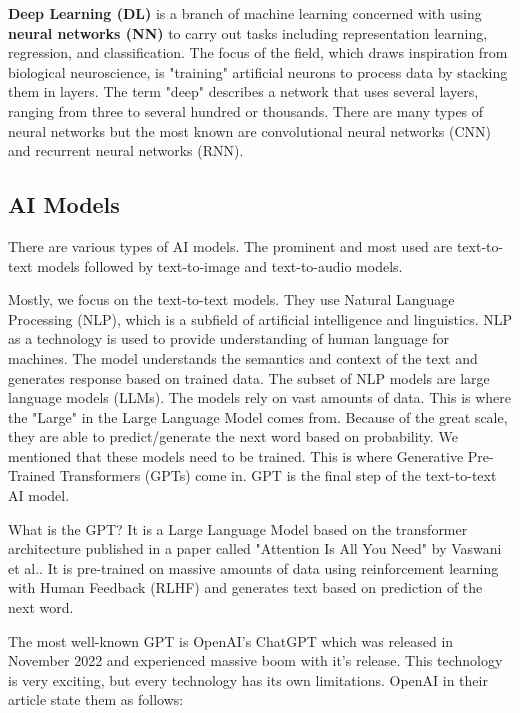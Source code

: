 \textbf{Deep Learning (DL)} is a branch of machine learning concerned with using \textbf{neural networks (NN)} to carry out tasks including representation learning, regression, and classification. The focus of the field, which draws inspiration from biological neuroscience, is "training" artificial neurons to process data by stacking them in layers. The term "deep" describes a network that uses several layers, ranging from three to several hundred or thousands\cite{LeCun2015}. There are many types of neural networks but the most known are convolutional neural networks (CNN) and recurrent neural networks (RNN).


\subsection{AI Models \label{subsec:AI-Models}}
There are various types of AI models. The prominent and most used are text-to-text models followed by text-to-image and text-to-audio models. 

Mostly, we focus on the text-to-text models. They use Natural Language Processing (NLP), which is a subfield of artificial intelligence and linguistics. NLP as a technology is used to provide understanding of human language for machines. The model understands the semantics and context of the text and generates response based on trained data. The subset of NLP models are large language models (LLMs). The models rely on vast amounts of data. This is where the "Large" in the Large Language Model comes from. Because of the great scale, they are able to predict/generate the next word based on probability. We mentioned that these models need to be trained. This is where Generative Pre-Trained Transformers (GPTs) come in. GPT is the final step of the text-to-text AI model. 

What is the GPT? It is a Large Language Model based on the transformer architecture published in a paper called "Attention Is All You Need" by Vaswani et al.\cite{vaswani2023attentionneed}. It is pre-trained on massive amounts of data using reinforcement learning with Human Feedback (RLHF) \cite{openai_chatgpt_page} and generates text based on prediction of the next word.

The most well-known GPT is OpenAI's ChatGPT which was released in November 2022 and experienced massive boom with it's release. This technology is very exciting, but every technology has its own limitations. OpenAI in their article \cite{openai_chatgpt_page} state them as follows:

